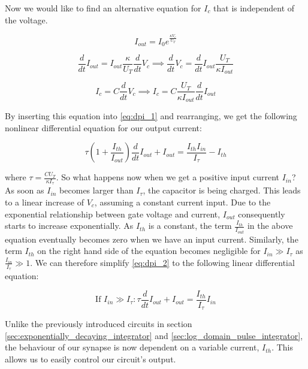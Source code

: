 Now we would like to find an alternative equation for $I_c$ that is independent of the voltage.

\begin{equation}
    I_{out} = I_0 e^{\frac{\kappa V_c}{U_T}}
\end{equation}

\begin{equation}
    \frac{d}{dt} I_{out} = I_{out} \frac{\kappa}{U_T} \frac{d}{dt} V_c \implies\frac{d}{dt} V_c = \frac{d}{dt} I_{out} \frac{U_T}{\kappa I_{out}}
\end{equation}

\begin{equation}
    I_c = C \frac{d}{dt} V_c \implies I_c = C \frac{U_T}{\kappa I_{out}} \frac{d}{dt} I_{out}
\end{equation}

By inserting this equation into \eqref{eq:dpi_1} and rearranging, we get the following nonlinear differential equation for our output current:

\begin{equation}
    \tau (1 + \frac{I_{th}}{I_{out}}) \frac{d}{dt} I_{out} + I_{out} = \frac{I_{th} I_{in}}{I_{\tau}} - I_{th}\label{eq:dpi_2}
\end{equation}

where $\tau = \frac{C U_T}{\kappa I_{\tau}}$. So what happens now when we get a positive input current $I_{in}$? As soon as $I_{in}$ becomes larger than $I_{\tau}$, the capacitor is being charged. This leads to a linear increase of $V_c$, assuming a constant current input. Due to the exponential relationship between gate voltage and current, $I_{out}$ consequently starts to increase exponentially. As $I_{th}$ is a constant, the term $\frac{I_{th}}{I_{out}}$ in the above equation eventually becomes zero when we have an input current. Similarly, the term $I_{th}$ on the right hand side of the equation becomes negligible for $I_{in} \gg I_{\tau}$ as $\frac{I_{in}}{I_{\tau}} \gg 1$. We can therefore simplify \eqref{eq:dpi_2} to the following linear differential equation:

\begin{equation}
    \text{If $I_{in} \gg I_{\tau}$}: \tau \frac{d}{dt} I_{out} + I_{out} = \frac{I_{th}}{I_{\tau}} I_{in}
\end{equation}

Unlike the previously introduced circuits in section \ref{sec:exponentially_decaying_integrator} and \ref{sec:log_domain_pulse_integrator}, the behaviour of our synapse is now dependent on a variable current, $I_{th}$. This allows us to easily control our circuit's output.\\

